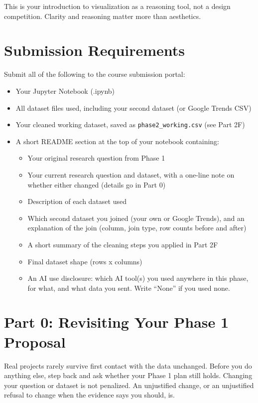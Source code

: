 \documentclass[11pt,letterpaper]{article}
\newcommand{\code}[1]{\texttt{#1}}
\begin{document}
This is your introduction to visualization as a reasoning tool, not a design competition. Clarity and reasoning matter more than aesthetics.

\section{Submission Requirements}

Submit all of the following to the course submission portal:
\begin{itemize}
  \item Your Jupyter Notebook (.ipynb)
  \item All dataset files used, including your second dataset (or Google Trends CSV)
  \item Your cleaned working dataset, saved as \code{phase2\_working.csv} (see Part 2F)
  \item A short README section at the top of your notebook containing:
  \begin{itemize}
    \item Your original research question from Phase 1
    \item Your current research question and dataset, with a one-line note on whether either changed (details go in Part 0)
    \item Description of each dataset used
    \item Which second dataset you joined (your own or Google Trends), and an explanation of the join (column, join type, row counts before and after)
    \item A short summary of the cleaning steps you applied in Part 2F
    \item Final dataset shape (rows x columns)
    \item An AI use disclosure: which AI tool(s) you used anywhere in this phase, for what, and what data you sent. Write ``None'' if you used none.
  \end{itemize}
\end{itemize}

\section{Part 0: Revisiting Your Phase 1 Proposal}

Real projects rarely survive first contact with the data unchanged. Before you do anything else, step back and ask whether your Phase 1 plan still holds. Changing your question or dataset is not penalized. An unjustified change, or an unjustified refusal to change when the evidence says you should, is.
\end{document}
